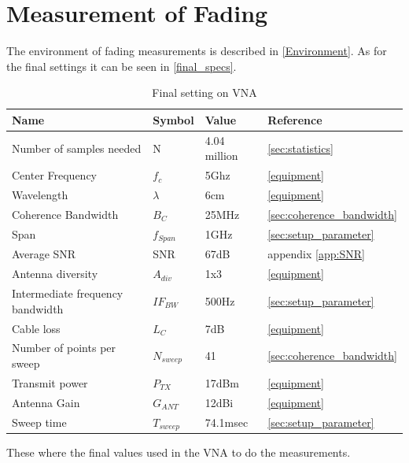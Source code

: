 \chapter{Measurement of Fading}
The environment of fading measurements is described in \autoref{Environment}. As for the final settings it can be seen in \autoref{final_specs}.
\begin{table}[H]
\centering
\begin{tabular}{|l|l|l|l|}
\hline
\textbf{Name}					& \textbf{Symbol} & \textbf{Value} 	& \textbf{Reference} 		\\ \hline
Number of samples needed        & N           	& 4.04 million      & \autoref{sec:statistics}	\\ \hline
Center Frequency                & $f_c$       	& 5Ghz              & \autoref{equipment}		\\ \hline
Wavelength                      & $\lambda$   	& 6cm           	& \autoref{equipment}		\\ \hline
Coherence Bandwidth             & $B_C$		  	& 25MHz   			& \autoref{sec:coherence_bandwidth} \\ \hline
Span 							& $f_{Span}$ 	& 1GHz 				& \autoref{sec:setup_parameter} \\ \hline
Average SNR	                   	& SNR          	& 67dB            	& appendix  \ref{app:SNR} 	\\ \hline
Antenna diversity               & $A_{div}$   	& 1x3    			& \autoref{equipment} 		\\ \hline
Intermediate frequency bandwidth & $IF_{BW}$    & 500Hz   			& \autoref{sec:setup_parameter} \\ \hline
Cable loss 						& $L_{C}$     	& 7dB         		& \autoref{equipment} 		\\ \hline
Number of points per sweep 		& $N_{sweep}$ 	& 41				& \autoref{sec:coherence_bandwidth} \\ \hline
Transmit power 					& $P_{TX}$ 		& 17dBm				& \autoref{equipment} 		\\ \hline
Antenna Gain 					& $G_{ANT}$ 	& 12dBi 			& \autoref{equipment} \\ \hline
Sweep time 						& $T_{sweep}$ 	& 74.1msec			& \autoref{sec:setup_parameter} \\ \hline
\end{tabular}
\caption{Final setting on VNA}
\label{final_specs}
\end{table}

These where the final values used in the VNA to do the measurements.


